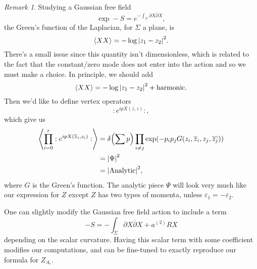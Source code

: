 \documentclass[leqno, openany]{memoir}
\theoremstyle{definition}
\theoremstyle{remark}
\newtheorem{rmk}[thm]{Remark}
\theoremstyle{plain}
\theoremstyle{definition}
\theoremstyle{remark}
\newcommand{\ep}{\varepsilon}
\newcommand{\mr}[1]{\mathrm{#1}}
\begin{document}
\begin{rmk}
Studying a Gaussian free field 
\[
\exp -S = e^{-\int_\Sigma \partial X \overline{\partial} X},
\]
the Green's function of the Laplacian, for $\Sigma$ a plane, is 
\[
\ev{XX} = - \log \abs{ z_1 - z_2 }^2.
\]
There's a small issue since this quantity isn't dimensionless, which is related to the fact that the constant/zero mode does not enter 
into the action and so we must make a choice. In principle, we should add 
\[
\ev{XX} = - \log \abs{ z_1 - z_2 }^2 + \text{harmonic}.
\]
Then we'd like to define vertex operators 
\[
:e^{i p X(\overline{z},z)}:,
\]
which give us 
\begin{align*}
    \ev{ \prod_{i = 0}^r : e^{i p X(\overline{z}_i,z_i)}: } &= \delta\qty(\sum p) \prod_{i \neq j} \exp(-p_i p_j G(z_i,\overline{z}_i, z_j,\overline{z_j})) \\
    &=\abs{ \Psi }^2 \\
    &= \abs{\mr{Analytic}}^2,
\end{align*}
where $G$ is the Green's function.
The analytic piece $\Psi$ will look very much like our expression for $Z$ except 
$Z$ has two types of momenta, unless $\ep_1 = -\ep_2$.

One can slightly modify the Gaussian free field action to include a term 
\[
-S = - \int_\Sigma \partial X \overline{\partial} X + a^{(2)} RX 
\]
depending on the scalar curvature. 
Having this scalar term with some coefficient modifies our computations, and can be fine-tuned to exactly reproduce our formula for $Z_{A_r}$.
\end{rmk}
\end{document}
